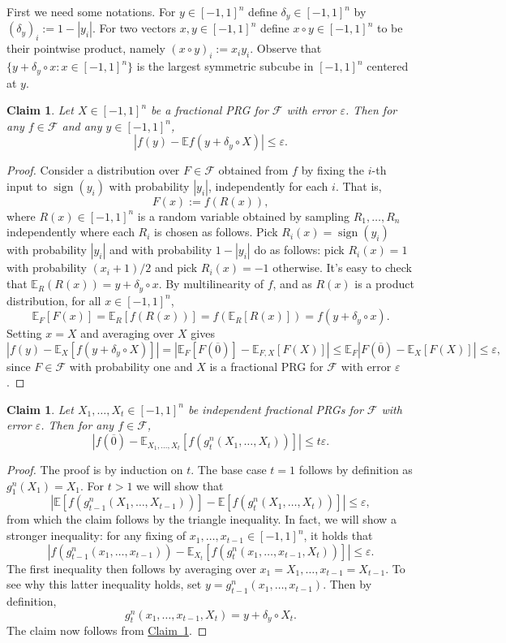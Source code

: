 \documentclass[11pt]{article}
\numberwithin{equation}{section}
\newtheorem{claim}[theorem]{Claim}
\theoremstyle{definition}
\theoremstyle{plain}
\newcommand{\expref}[2]{\hyperref[#2]{#1~\ref{#2}}}
\newcommand{\E}{\mathbb{E}}
\newcommand{\FF}{\mathcal{F}}
\newcommand{\eps}{\varepsilon}
\DeclareMathOperator{\sign}{sign}     %
\newcommand{\zero}{\overline{0}}
\begin{document}
First we need some notations.
For $y \in [-1,1]^n$ define $\delta_y \in [-1,1]^n$ by $(\delta_y)_i := 1-|y_i|$. For two vectors $x,y \in [-1,1]^n$ define $x \circ y \in [-1,1]^n$ to be their pointwise product, namely $(x \circ y)_i := x_i y_i$.
Observe that $\{y + \delta_y \circ x: x \in [-1,1]^n\}$ is the largest symmetric subcube in $[-1,1]^n$ centered at $y$.

\begin{claim}
\label{claim:prg_around_nonzero}
Let $X \in [-1,1]^n$ be a fractional PRG for $\FF$ with error $\eps$. Then for any $f \in \FF$ and any $y \in [-1,1]^n$,
$$
\left| f(y) - \E f(y + \delta_y \circ X) \right| \le \eps.
$$
\end{claim}

\begin{proof}
Consider a distribution over $F \in \FF$ obtained from $f$ by fixing the $i$-th input to $\sign(y_i)$ with probability $|y_i|$,
independently for each $i$. That is,
$$
F(x) := f(R(x)),
$$
	where $R(x) \in [-1,1]^n$ is a random variable obtained by sampling $R_1,\ldots,R_n$ independently where
	each $R_i$ is chosen as follows. Pick $R_i(x)=\sign(y_i)$ with probability $|y_i|$ and with probability $1-|y_i|$ do as follows: pick $R_i(x) = 1$ with probability $(x_i+1)/2$ and pick $R_i(x)=-1$ otherwise. It's easy to check that $\E_R(R(x)) = y + \delta_y \circ x$. By  multilinearity of $f$, and as $R(x)$ is a product distribution, for all $x\in [-1,1]^n$,
$$
\E_F[F(x)] = \E_R [f (R(x))] = f( \E_R[R(x)]) = f(y + \delta_y \circ x).
$$
Setting $x=X$ and averaging over $X$ gives
$$
\left| f(y) - \E_X [f(y + \delta_y \circ X)] \right| =
	\left| \E_F [F(\zero)] - \E_{F,X} [F(X)] \right| \le
\E_F \left| F(\zero) - \E_{X} [F(X)] \right| \le \eps,
$$
since $F \in \FF$ with probability one and $X$ is a fractional PRG for $\FF$ with error $\eps$.
\end{proof}

\begin{claim}
\label{claim:gt_error}
Let $X_1,\ldots,X_t \in [-1,1]^n$ be independent fractional PRGs for $\FF$ with error $\eps$. Then for any $f \in \FF$,
$$
\left| f(\zero) - \E_{X_1,\ldots,X_t} [f(g_t^n(X_1,\ldots,X_t))] \right| \le t \eps.
$$
\end{claim}

\begin{proof}
The proof is by induction on $t$. The base case $t=1$ follows by definition as $g_1^n(X_1)=X_1$. For $t>1$ we will show that
$$
\left| \E[f(g_{t-1}^n(X_1,\ldots,X_{t-1}))] - \E [f(g_t^n(X_1,\ldots,X_t))] \right| \le \eps,
$$
from which the claim follows by the triangle inequality. In fact, we will show a stronger inequality: for any fixing of $x_1,\ldots,x_{t-1} \in [-1,1]^n$,
it holds that
$$
\left| f(g_{t-1}^n(x_1,\ldots,x_{t-1})) - \E_{X_t}[ f(g_t^n(x_1,\ldots,x_{t-1},X_t))] \right| \le \eps.
$$
The first inequality then follows by averaging over $x_1=X_1,\ldots,x_{t-1}=X_{t-1}$. To see why this latter inequality holds,
set $y = g_{t-1}^n(x_1,\ldots,x_{t-1})$. Then by definition,
$$
g_t^n(x_1,\ldots,x_{t-1},X_t) = y + \delta_y \circ X_t.
$$
The claim now follows from \expref{Claim}{claim:prg_around_nonzero}.
\end{proof}
\end{document}
